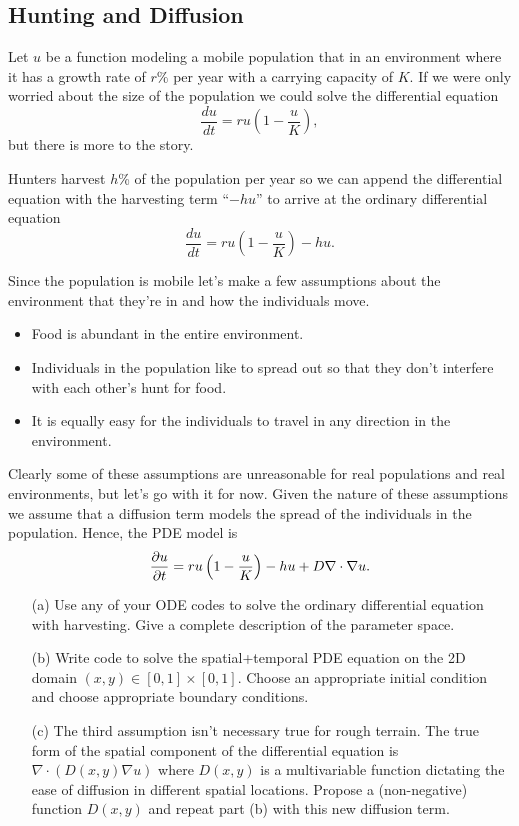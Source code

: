 \subsection{Hunting and Diffusion}
Let $u$ be a function modeling a mobile population that in an environment where it has a
growth rate of $r\%$ per year with a carrying capacity of $K$.  If we were only worried
about the size of the population we could solve the differential equation 
\[ \frac{du}{dt} = ru \left( 1-\frac{u}{K} \right), \]
but there is more to the story.  

Hunters harvest $h$\% of the population per year so we can append the differential
equation with the harvesting term ``$-h u$'' to arrive at the ordinary differential
equation 
\[ \frac{du}{dt} = ru \left( 1-\frac{u}{K} \right) - hu. \]

Since the population is mobile let's make a few assumptions about the environment that
they're in and how the individuals move.
\begin{itemize}
    \item Food is abundant in the entire environment.
    \item Individuals in the population like to spread out so that they don't
        interfere with each other's hunt for food.
    \item It is equally easy for the individuals to travel in any direction in the
        environment.
\end{itemize}
Clearly some of these assumptions are unreasonable for real populations and real
environments, but let's go with it for now.  Given the nature of these assumptions we
assume that a diffusion term models the spread of the individuals in the population.
Hence, the PDE model is
\[ \frac{\partial{u}}{\partial{t}} = ru\left( 1-\frac{u}{K} \right) - hu + D \nabla \cdot \nabla u. \]
\begin{enumerate}
    \item[(a)] Use any of your ODE codes to solve the ordinary differential equation
        with harvesting.  Give a complete description of the parameter space.
    \item[(b)] Write code to solve the spatial+temporal PDE equation on the 2D domain
        $(x,y) \in [0,1] \times [0,1]$.  Choose an appropriate initial condition and
        choose appropriate boundary conditions.
    \item[(c)] The third assumption isn't necessary true for rough terrain. The true
        form of the spatial component of the differential equation is $\nabla \cdot
        \left( D(x,y) \nabla u \right)$ where $D(x,y)$ is a multivariable function
        dictating the ease of diffusion in different spatial locations.  Propose a
        (non-negative) function $D(x,y)$ and repeat part (b) with this new diffusion
        term.
\end{enumerate}

